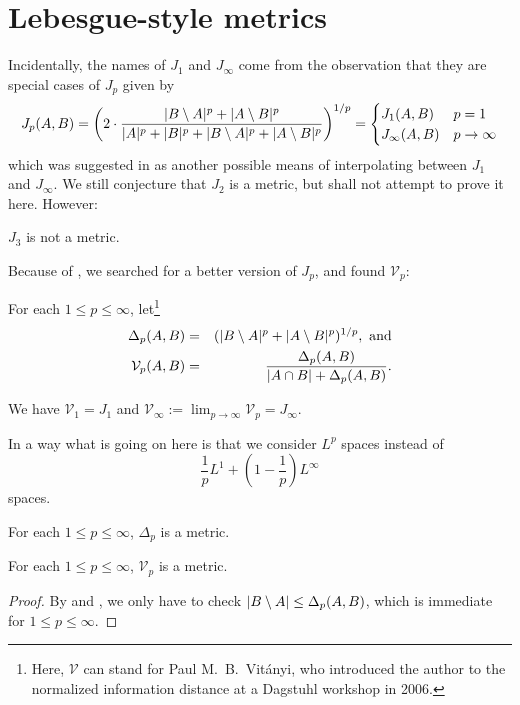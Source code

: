	\section{Lebesgue-style metrics}
		Incidentally, the names of $J_1$ and $J_{\infty}$ come from the observation that they are special cases of $J_p$ given by
		\[
			J_p(A,B)=
			\left(2\cdot
			\frac{
			\lvert B\setminus A\rvert^p+\lvert A\setminus B\rvert^p
			}{
			\lvert A\rvert^p+\lvert B\rvert^p+\lvert B\setminus A\rvert^p+\lvert A\setminus B\rvert^p
			}
			\right)^{1/p}
			=
			\begin{cases}
			J_1(A,B) & p=1\\
			J_{\infty}(A,B) & p\to\infty
			\end{cases}
		\]
		which was suggested in \cite{10.1007/978-3-030-93100-1_8} as another possible means of interpolating between $J_1$ and $J_{\infty}$.
		We still conjecture that $J_2$ is a metric, but shall not attempt to prove it here. However:
		\begin{theorem}\label{thm:j3}
			 $J_3$ is not a metric.
		\end{theorem}

		Because of , we searched for a better version of $J_p$, and found $\mathcal V_p$:
		\begin{definition}
		For each $1\le p\le\infty$, let\footnote{Here, $\mathcal V$ can stand for Paul M.~B.~Vit\'anyi, who introduced the %
		author to the normalized information distance at a Dagstuhl workshop in 2006.}
		\begin{eqnarray*}
		\Delta_p(A,B)&=&(\lvert B\setminus A\rvert^p+\lvert A\setminus B\rvert^p)^{1/p},\text{ and}
		\\
		\mathcal V_p(A,B)&=&\frac{\Delta_p(A,B)}{\lvert A\cap B\rvert + \Delta_p(A,B)}.
		\end{eqnarray*}
		\end{definition}
		We have $\mathcal V_1=J_1$ and $\mathcal V_{\infty}:=\lim_{p\to\infty}\mathcal V_p=J_{\infty}$.

		In a way what is going on here is that we consider $L^p$ spaces instead of
		\[
			\frac1p L^1 + \left(1-\frac1p\right)L^{\infty}
		\]
		spaces.

		\begin{theorem}\label{fun-factory}
			 For each $1\le p\le\infty$, $\Delta_p$ is a metric.
		\end{theorem}

		\begin{theorem}
			 For each $1\le p\le\infty$, $\mathcal V_p$ is a metric.
		\end{theorem}
		\begin{proof}
			By  and ,
			we only have to check $\lvert B\setminus A\rvert\le \Delta_p(A,B)$, which is immediate for $1\le p\le\infty$.
		\end{proof}

